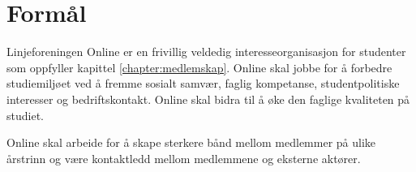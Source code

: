 \chapter{Formål}

Linjeforeningen Online  er en frivillig veldedig interesseorganisasjon for studenter som oppfyller kapittel \ref{chapter:medlemskap}. Online skal jobbe for å forbedre studiemiljøet ved å fremme sosialt samvær, faglig kompetanse, studentpolitiske interesser og bedriftskontakt. Online skal bidra til å øke den faglige kvaliteten på studiet.

Online skal arbeide for å skape sterkere bånd mellom medlemmer på ulike årstrinn og være kontaktledd mellom medlemmene og eksterne aktører. 
